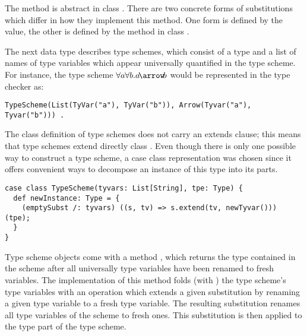 \documentclass[a4paper,12pt,twoside,titlepage]{book}
\begin{document}
{The  method is abstract in class .  There are
two concrete forms of substitutions which differ in how they
implement this method.  One form is defined by the  value,
the other is defined by the  method in class
.

The next data type describes type schemes, which consist of a type and
a list of names of type variables which appear universally quantified
in the type scheme. 
For instance, the type scheme $\forall a\forall b.a \!\arrow\! b$ would be represented in the type checker as:
\begin{lstlisting}
TypeScheme(List(TyVar("a"), TyVar("b")), Arrow(Tyvar("a"), Tyvar("b"))) .
\end{lstlisting}
The class definition of type schemes does not carry an extends
clause; this means that type schemes extend directly class
.  Even though there is only one possible way to
construct a type scheme, a case class representation was chosen
since it offers convenient ways to decompose an instance of this type into its
parts.
\begin{lstlisting}
case class TypeScheme(tyvars: List[String], tpe: Type) {
  def newInstance: Type = {
    (emptySubst /: tyvars) ((s, tv) => s.extend(tv, newTyvar())) (tpe);
  }
}
\end{lstlisting}
Type scheme objects come with a method , which
returns the type contained in the scheme after all universally type
variables have been renamed to fresh variables. The implementation of
this method folds (with \code{/:}) the type scheme's type variables
with an operation which extends a given substitution  by
renaming a given type variable  to a fresh type
variable. The resulting substitution renames all type variables of the
scheme to fresh ones. This substitution is then applied to the type
part of the type scheme.

}
\end{document}
